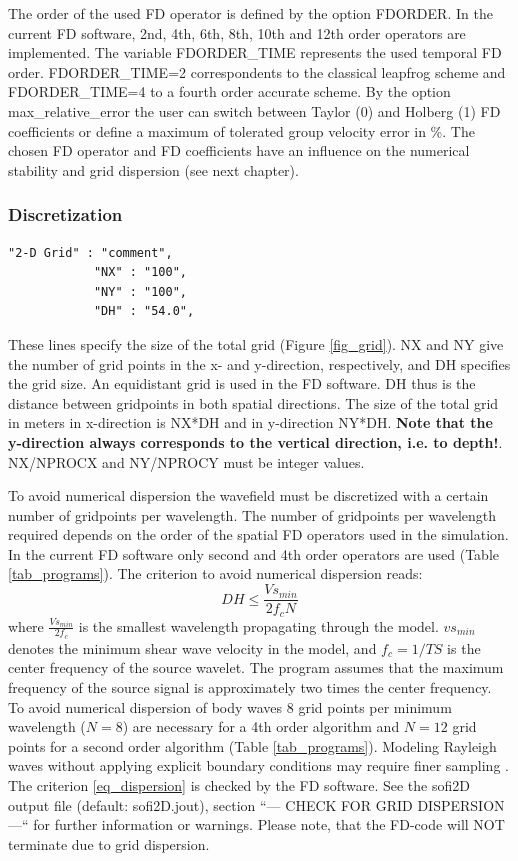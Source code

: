 \documentclass[11pt,onecolumn,oneside]{article}
\begin{document}
The order of the used FD operator is defined by the option FDORDER. In the current FD software, 2nd, 4th, 6th, 8th, 10th and 12th order operators are implemented. The variable FDORDER\_TIME represents the used temporal FD order. FDORDER\_TIME=2 correspondents to the classical leapfrog scheme and FDORDER\_TIME=4 to a fourth order accurate scheme. By the option max\_relative\_error the user can switch between Taylor (0) and Holberg (1) FD coefficients or define a maximum of tolerated group velocity error in \%. The chosen FD operator and FD coefficients have an influence on the numerical stability and grid dispersion (see next chapter).

\subsubsection{Discretization}

\begin{verbatim}
"2-D Grid" : "comment",
			"NX" : "100",
			"NY" : "100",
			"DH" : "54.0",
\end{verbatim}

These lines specify the size of the total grid (Figure  \ref{fig_grid}). NX and NY give the number of grid points in the x- and y-direction, respectively, and DH specifies the grid size. An equidistant grid is used in the FD software. DH thus is the distance between gridpoints in both spatial directions. The size of the total grid in meters in x-direction is NX*DH and in y-direction NY*DH.
\textbf{Note that the y-direction always corresponds to the vertical direction, i.e. to depth!}. NX/NPROCX and NY/NPROCY must be integer values.

To avoid numerical dispersion the wavefield must be discretized with a certain number of gridpoints per wavelength. The number of gridpoints per wavelength required depends on the order of the spatial
FD operators used in the simulation. In the current FD software only second and 4th order operators are used (Table \ref{tab_programs}). The criterion to avoid numerical dispersion reads:
\begin{equation}
DH\le\frac{Vs_{min}}{2 f_c N} \label{eq_dispersion}
\end{equation}
where $\frac{Vs_{min}}{2 f_c}$ is the smallest wavelength propagating through the model. $vs_{min}$ denotes the minimum shear wave velocity in the model, and $f_c=1/TS$ is the center frequency of the source wavelet. The program assumes that the maximum frequency of the source signal is approximately two times the center frequency. To avoid numerical dispersion of body waves 8 grid points per minimum wavelength ($N=8$) are necessary for a 4th order algorithm and  $N=12$ grid points for a second order algorithm (Table \ref{tab_programs}). Modeling Rayleigh waves without applying explicit boundary conditions may require finer sampling \cite{bohlen:06}. The criterion \ref{eq_dispersion} is checked by the FD software. See the sofi2D output file (default: sofi2D.jout), section ``--- CHECK FOR GRID DISPERSION ---`` for further information or warnings. Please note, that the FD-code will NOT terminate due to grid dispersion.
\end{document}
